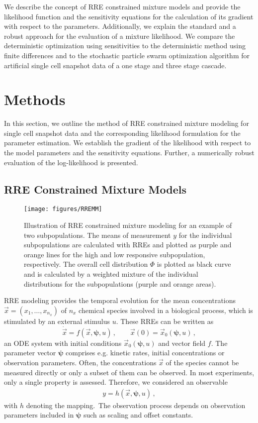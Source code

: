 \documentclass{llncs}
\newcommand{\x}{\vec{x}}
\newcommand{\vpsi}{\boldsymbol{\psi}}
\begin{document}
We describe the concept of RRE constrained mixture models and provide the likelihood function and the sensitivity equations for the calculation of its gradient with respect to the parameters. Additionally, we explain the standard and a robust approach for the evaluation of a mixture likelihood. We compare the deterministic optimization using sensitivities to the deterministic method using finite differences and to the stochastic particle swarm optimization algorithm for artificial single cell snapshot data of a one stage and three stage cascade.
\section{Methods}\label{sec:methods}
In this section, we outline the method of RRE constrained mixture modeling for single cell snapshot data and the corresponding likelihood formulation for the parameter estimation. We establish the gradient of the likelihood with respect to the model parameters and the sensitivity equations. Further, a numerically robust evaluation of the log-likelihood is presented.
\subsection{RRE Constrained Mixture Models}
\begin{figure}[tb]
\centering
\texttt{[image: figures/RREMM]}
\caption{Illustration of RRE constrained mixture modeling for an example of two subpopulations. The means of measurement $y$ for the individual subpopulations are calculated with RREs and plotted as \color{cols1}purple \color{black}and \color{cols2}orange \color{black}lines for the high and low responsive subpopulation, respectively. The overall cell distribution $\Phi$ is plotted as black curve and is calculated by a weighted mixture of the individual distributions for the subpopulations (purple and orange areas). }\label{fig:concept}
\end{figure}
RRE modeling provides the temporal evolution for the mean concentrations $\x=\left(x_1,\ldots,x_{n_x}\right)$ of $n_x$ chemical species involved in a biological process, which is stimulated by an external stimulus $u$. These RREs can be written as 
\begin{equation}
\dot{\x}=f(\x,\vpsi,u)\,, \qquad \x(0)=\x_0(\vpsi,u)\,, \label{eq:RRE}
\end{equation}
an ODE system with initial conditions $\x_0(\vpsi,u)$ and vector field $f$. The parameter vector $\vpsi$ comprises e.g. kinetic rates, initial concentrations \color{revcol}or observation parameters. \color{black} Often, the concentrations $\x$ of the species cannot be measured directly or only a subset of them can be observed. In most experiments, only a single property is assessed. Therefore, we considered an observable 
\begin{align*}
y = h(\x,\vpsi,u)\,,
\end{align*}
with $h$ denoting the mapping.\color{revcol}~The observation process depends on observation parameters included in $\vpsi$ such as scaling and offset constants. \color{black}
\end{document}
